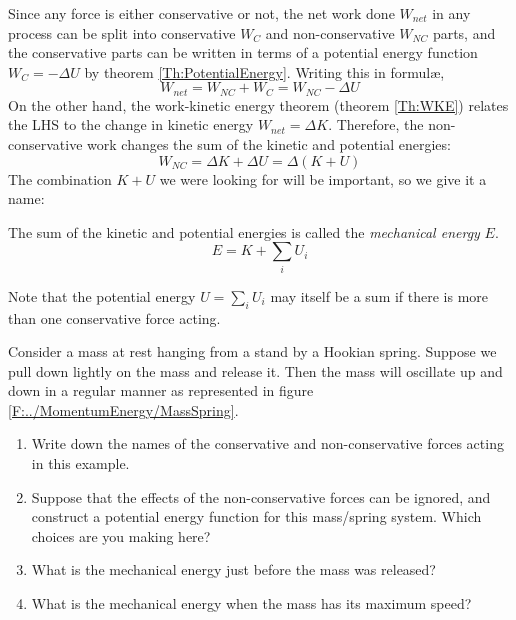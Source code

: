 Since any force is either conservative or not, the net work done $W_{net}$ in any process can be split into conservative $W_C$ and non-conservative $W_{NC}$ parts, and the conservative parts can be written in terms of a potential energy function $W_C =-Δ U$ by theorem \ref{Th:PotentialEnergy}. Writing this in formul\ae{},
$$
W_{net} = W_{NC}+W_C = W_{NC}-ΔU
$$
On the other hand, the work-kinetic energy theorem (theorem \ref{Th:WKE}) relates the LHS to the change in kinetic energy $W_{net} = ΔK$. Therefore, the non-conservative work changes the sum of the kinetic and potential energies:
$$
W_{NC}= Δ K + ΔU = Δ (K+U)
$$
The combination $K+U$ we were looking for will be important, so we give it a name:
\begin{definition}
The sum of the kinetic and potential energies is called the {\em mechanical energy} $E$.
$$
E = K + ∑_i U_i
$$ 
\end{definition}
Note that the potential energy $U=∑_i U_i$ may itself be a sum if there is more than one conservative force acting. 


\begin{example}
Consider a mass at rest hanging from a stand by a Hookian spring. Suppose we pull down lightly on the mass and release it. Then the mass will oscillate up and down in a regular manner as represented in figure \ref{F:../MomentumEnergy/MassSpring}.
\begin{enumerate}
\item Write down the names of the conservative and non-conservative forces acting in this example. 
\item Suppose that the effects of the non-conservative forces can  be ignored, and construct a potential energy function for this mass/spring system. Which choices are you making here?
\item What is the mechanical energy just before the mass was released? 
\item What is the mechanical energy when the mass has its maximum speed?
\end{enumerate}
\end{example}

